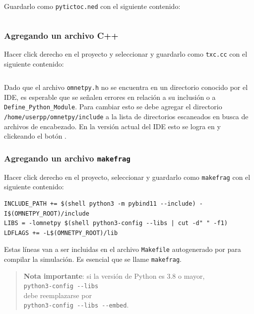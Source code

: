 \documentclass[]{article}
\begin{document}
Guardarlo como \verb!pytictoc.ned! con el siguiente contenido:

\inputminted{text}{codelistings/tictoc.ned}

\subsubsection{Agregando un archivo C++}

Hacer click derecho en el proyecto y seleccionar  y
guardarlo como \verb!txc.cc! con el siguiente contenido:

\inputminted{c++}{codelistings/tictoc.cc}

Dado que el archivo \verb!omnetpy.h! no se encuentra en un directorio conocido
por el IDE, es esperable que se señalen errores en relación a su inclusión o a
\verb!Define_Python_Module!. Para cambiar esto se debe agregar el directorio
\verb!/home/userpp/omnetpy/include! a la lista de directorios escaneados en
busca de archivos de encabezado. En la versión actual del IDE esto se logra en
 y clickeando el botón .

\subsubsection{Agregando un archivo \texttt{makefrag}}

Hacer click derecho en el proyecto, seleccionar  y
guardarlo como \verb!makefrag! con el siguiente contenido:

\begin{verbatim}
INCLUDE_PATH += $(shell python3 -m pybind11 --include) -I$(OMNETPY_ROOT)/include
LIBS = -lomnetpy $(shell python3-config --libs | cut -d" " -f1)
LDFLAGS += -L$(OMNETPY_ROOT)/lib
\end{verbatim}

Estas líneas van a ser incluidas en el archivo \verb!Makefile! autogenerado por
\omnetpp{} para compilar la simulación. Es esencial que se llame
\verb!makefrag!.

\begin{quotation}
\noindent\textbf{Nota importante}: si la versión de Python es 3.8 o mayor,\\
\verb!python3-config --libs!\\
debe reemplazarse por\\
\verb!python3-config --libs --embed!.
\end{quotation}
\end{document}
